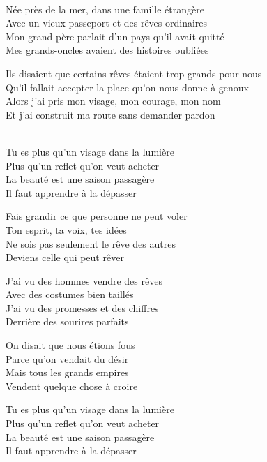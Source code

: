 \begin{lyrics}

\\
Née près de la mer, dans une famille étrangère\\
Avec un vieux passeport et des rêves ordinaires\\
Mon grand-père parlait d’un pays qu’il avait quitté\\
Mes grands-oncles avaient des histoires oubliées

Ils disaient que certains rêves étaient trop grands pour nous\\
Qu’il fallait accepter la place qu’on nous donne à genoux\\
Alors j’ai pris mon visage, mon courage, mon nom\\
Et j’ai construit ma route sans demander pardon

\\
Tu es plus qu’un visage dans la lumière\\
Plus qu’un reflet qu’on veut acheter\\
La beauté est une saison passagère\\
Il faut apprendre à la dépasser

Fais grandir ce que personne ne peut voler\\
Ton esprit, ta voix, tes idées\\
Ne sois pas seulement le rêve des autres\\
Deviens celle qui peut rêver

J’ai vu des hommes vendre des rêves\\
Avec des costumes bien taillés\\
J’ai vu des promesses et des chiffres\\
Derrière des sourires parfaits

On disait que nous étions fous\\
Parce qu’on vendait du désir\\
Mais tous les grands empires\\
Vendent quelque chose à croire

Tu es plus qu’un visage dans la lumière\\
Plus qu’un reflet qu’on veut acheter\\
La beauté est une saison passagère\\
Il faut apprendre à la dépasser


\end{lyrics}
